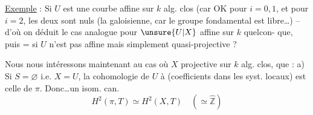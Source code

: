 \uline{Exemple} :  Si $U$ est une courbe affine
sur $k$ alg. clos  (car OK pour $i=0,1$, et
pour $i=2$, les deux  sont nuls
(la  galoisienne, car le groupe fondamental
 est  libre\ldots) -- d'où on déduit le
cas analogue pour $\unsure{U|X}$ affine sur $k$ quelcon-
que, puis = si $U$ n'est pas affine mais
simplement quasi-projective ? 

Nous nous intéressons maintenant au
cas où $X$ projective  sur $k$ alg. clos, 
que : 
a) Si $S=\varnothing$ i.e. $X=U$, la cohomologie de $U$
à (coefficients dans les syst. locaux) est celle
de $\pi$. Donc\ldots un isom. can.
\[
H^2(\pi,T)\simeq H^2(X,T)\quad(\simeq\widehat{\mathbb Z})
\]

